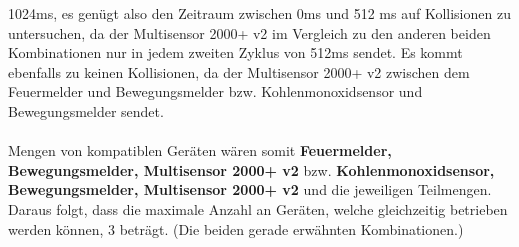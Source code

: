 \documentclass{../exercisesheet}
\begin{document}
\begin{exercise}{3}
\begin{subexercise}
	1024ms, es genügt also den Zeitraum zwischen 0ms und 512 ms auf Kollisionen zu untersuchen, da der Multisensor 2000+ v2 im Vergleich zu den anderen
	beiden Kombinationen nur in jedem zweiten Zyklus von 512ms sendet. Es kommt ebenfalls zu keinen Kollisionen, da der Multisensor 2000+ v2 zwischen dem
	Feuermelder und Bewegungsmelder bzw. Kohlenmonoxidsensor und Bewegungsmelder sendet.\\ \ \\
	Mengen von kompatiblen Geräten wären somit \textbf{Feuermelder, Bewegungsmelder, Multisensor 2000+ v2} bzw. \textbf{Kohlenmonoxidsensor,	
	Bewegungsmelder, Multisensor 2000+ v2} und die jeweiligen Teilmengen. \\
	Daraus folgt, dass die maximale Anzahl an Geräten, welche gleichzeitig betrieben werden können, 3 beträgt. (Die beiden gerade erwähnten Kombinationen.)
	\end{subexercise}
\end{exercise}
\end{document}
